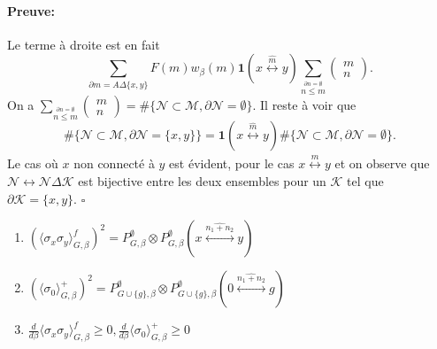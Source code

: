 \documentclass[a4paper,12pt]{report}
\newenvironment{preuve}{\paragraph{Preuve:}}{\hfill$\square$}
\begin{document}
\begin{preuve}
Le terme à droite est en fait $$
\sum_{\partial m = A \Delta \{x,y\}} F(m)w_\beta(m)\mathbf{1}(x\overset{\hat{m}}{\longleftrightarrow}y)\sum_{\overset{\partial n = \emptyset}{n \leqslant m}}\left(\begin{array}{c} m \\ n \end{array} \right).
$$
On a $\displaystyle\sum_{\overset{\partial n = \emptyset}{n \leqslant m}}\left(\begin{array}{c} m \\ n \end{array} \right) = \#\{\mathcal{N}\subset \mathcal{M}, \partial \mathcal{N} = \emptyset\}$.
Il reste à voir que  $$\#\big\{ \mathcal{N}\subset \mathcal{M},\partial \mathcal{N} = \{x,y\}\big\} = \mathbf{1}(x\overset{\hat{m}}{\longleftrightarrow}y)\#\{\mathcal{N}\subset \mathcal{M}, \partial \mathcal{N} = \emptyset\}.$$
Le cas où $x$ non connecté à $y$ est évident, pour le cas $x\overset{\hat{m}}{\leftrightarrow}y$ et on observe que $\mathcal{N} \longleftrightarrow \mathcal{N}\Delta\mathcal{K}$ est bijective entre les deux ensembles pour un $\mathcal{K}$ tel que $\partial \mathcal{K} = \{x,y\}$.
\end{preuve}

\begin{prop}\leavevmode
\begin{enumerate}
\item $(\langle \sigma_x \sigma_y \rangle_{G,\beta}^f)^2 = P_{G,\beta}^\emptyset \otimes P_{G,\beta}^\emptyset (x\overset{\widehat{n_1+n_2}}{\longleftrightarrow} y)$
\item $(\langle \sigma_0\rangle_{G,\beta}^+)^2= P_{G\cup\{g\},\beta}^\emptyset \otimes P_{G\cup\{g\},\beta}^\emptyset (0\overset{\widehat{n_1+n_2}}{\longleftrightarrow} g)$
\item $\displaystyle \frac{d}{d\beta}\langle \sigma_x \sigma_y \rangle_{G,\beta}^f \geqslant 0, \frac{d}{d\beta}\langle \sigma_0 \rangle_{G,\beta}^+ \geqslant 0$
\end{enumerate}
\end{prop}
\end{document}
